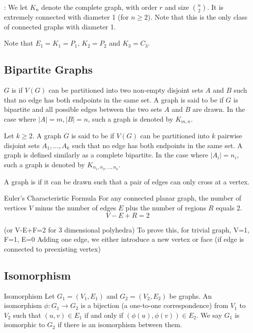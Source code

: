 : We let $K_n$ denote the complete graph, with order $r$ and size $\binom{n}{2}$. It is extremely connected with diameter 1 (for $n \ge 2$). Note that this is the only class of connected graphs with diameter 1.

Note that $E_1 = K_1 = P_1$, $K_2 = P_2$ and $K_3 = C_3$.

\subsection{Bipartite Graphs}
$G$ is  if $V(G)$ can be partitioned into two non-empty disjoint sets $A$ and $B$ such that no edge has both endpoints in the same set. A graph is said to be  if $G$ is bipartite and all possible edges between the two sets $A$ and $B$ are drawn. In the case where $|A|=m, |B|=n$, such a graph is denoted by $K_{m,n}$.

Let $k \ge 2$. A graph $G$ is said to be  if $V(G)$ can be partitioned into $k$ pairwise disjoint sets $A_1, \dots, A_k$ such that no edge has both endpoints in the same set. A  graph is defined similarly as a complete bipartite. In the case where $|A_i| = n_i$, such a graph is denoted by $K_{n_1,n_2,\dots,n_k}$.

A graph is  if it can be drawn such that a pair of edges can only cross at a vertex.

\begin{thrm}{Euler's Characteristic Formula}{}
For any connected planar graph, the number of vertices $V$ minus the number of edges $E$ plus the number of regions $R$ equals 2. 
\begin{equation} V-E+R = 2 \end{equation}
\end{thrm}

(or V-E+F=2 for 3 dimensional polyhedra)
To prove this, 
for trivial graph, V=1, F=1, E=0
Adding one edge, we either introduce a new vertex or face (if edge is connected to preexisting vertex)



\subsection{Isomorphism}
\begin{defn}{Isomorphism}{}
Let $G_1 = (V_1, E_1)$ and $G_2 = (V_2, E_2)$ be graphs. An isomorphism $\phi : G_1 \to G_2$ is a bijection (a one-to-one correspondence) from $V_1$ to $V_2$ such that $(u,v) \in E_1$ if and only if $(\phi(u),\phi(v)) \in E_2$. We say $G_1$ is isomorphic to $G_2$ if there is an isomorphism between them.
\end{defn}



